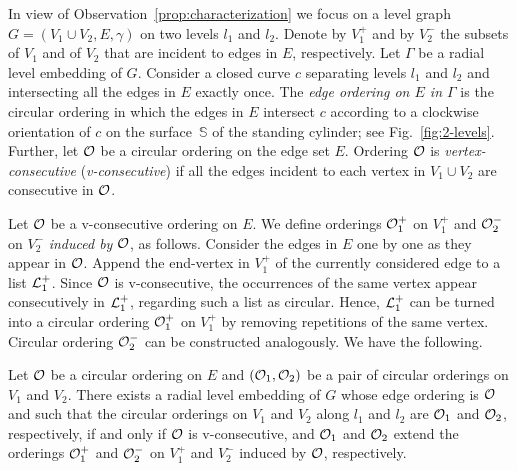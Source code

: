 \documentclass{llncs}
\begin{document}
In view of Observation~\ref{prop:characterization} we focus on a level graph $G=(V_1 \cup V_2,E,\gamma)$ on two levels $l_1$ and $l_2$. Denote by $V_1^+$ and by $V_{2}^-$ the subsets of $V_1$ and of $V_2$ that are incident to edges in $E$, respectively.
Let $\Gamma$ be a radial level embedding of $G$.
Consider a closed curve $c$ separating levels $l_1$ and $l_2$ and intersecting all the edges in $E$ exactly once.
The {\em edge ordering on $E$ in $\Gamma$} is the circular ordering in which the edges in $E$ intersect $c$ according to a clockwise orientation of $c$ on the surface~$\mathbb S$ of the standing cylinder; see Fig.~\ref{fig:2-levels}.
Further, let $\cal O$ be a circular ordering on the edge set $E$. Ordering $\cal O$ is {\em vertex-consecutive} ({\em v-consecutive}) if all the edges incident to each vertex in $V_1 \cup V_2$ are consecutive in $\cal O$. 

Let $\cal O$ be a v-consecutive ordering on $E$. 
We define orderings ${\cal O}^+_1$ on $V_1^+$ and ${\cal O}^-_2$ on $V_2^-$ {\em induced by} ${\cal O}$, as follows.
Consider the edges in $E$ one by one as they appear in ${\cal O}$. Append the end-vertex in $V^+_1$ of the currently considered edge to a list ${\cal L}^+_1$. 
Since $\cal O$ is v-consecutive, the occurrences of the same vertex appear consecutively in ${\cal L}^+_1$, regarding such a list as circular.
Hence, ${\cal L}^+_1$ can be turned into a circular ordering ${\cal O}^+_1$ on $V^+_1$ by removing repetitions of the same vertex. Circular ordering ${\cal O}^-_2$ can be constructed analogously. We have the following.


\begin{lemma}\label{le:torus-characterization}
Let $\cal O$ be a circular ordering on $E$ and $({\cal O}_1,{\cal O}_2)$ be a pair of circular orderings on $V_1$ and $V_2$. 
There exists a radial level embedding of $G$ whose edge ordering is $\cal O$ and such that the circular orderings on $V_1$ and $V_2$ along $l_1$ and $l_2$ are ${\cal O}_1$ and ${\cal O}_2$, respectively,
if and only if $\cal O$ is v-consecutive, and ${\cal O}_1$ and ${\cal O}_2$ extend the orderings ${\cal O}^+_1$ and ${\cal O}^-_2$ on $V_1^+$ and $V_2^-$ induced by $\cal O$, respectively.
\end{lemma}
\end{document}
